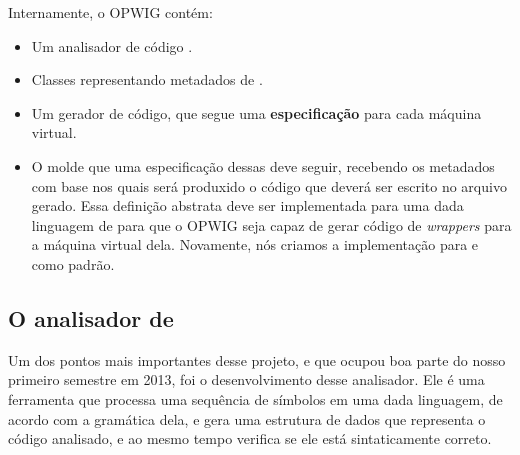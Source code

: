   Internamente, o OPWIG contém:
  \begin{itemize}
    \item Um analisador de código \CXX{}.
    \item Classes representando metadados de \CXX{}.
    \item Um gerador de código, que segue uma \textbf{especificação} para cada máquina virtual.
    \item O molde que uma especificação dessas deve seguir, recebendo
      os metadados com base nos quais será produxido o código que deverá ser escrito no
      arquivo gerado. Essa
      definição abstrata deve ser implementada para uma dada linguagem de \script{} para
      que o OPWIG seja capaz de gerar código de \textit{wrappers} para a máquina virtual dela.
      Novamente, nós criamos a implementação para  e  como padrão.
  \end{itemize}
  
  \subsection{O analisador de \CXX{}}
  Um dos pontos mais importantes desse projeto, e que ocupou boa parte do nosso primeiro
  semestre em 2013, foi o desenvolvimento desse analisador. Ele é uma ferramenta que
  processa uma sequência de símbolos em uma dada linguagem, de acordo com a gramática
  dela, e gera uma estrutura de dados que representa o código analisado, e ao mesmo
  tempo verifica se ele está sintaticamente correto.
  
